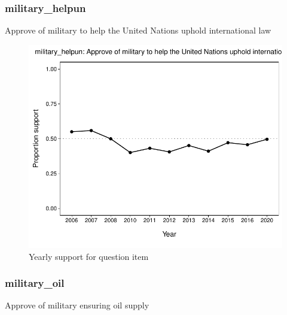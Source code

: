 \documentclass[
  12pt]{article}
\begin{document}
\hypertarget{military_helpun}{%
\subsubsection{military\_helpun}\label{military_helpun}}

Approve of military to help the United Nations uphold international law

\begin{figure}

{\centering \includegraphics{error-checking_files/figure-latex/unnamed-chunk-3-31} 

}

\caption{Yearly support for question item}\label{fig:unnamed-chunk-3-31}
\end{figure}

\hypertarget{military_oil}{%
\subsubsection{military\_oil}\label{military_oil}}

Approve of military ensuring oil supply
\end{document}
